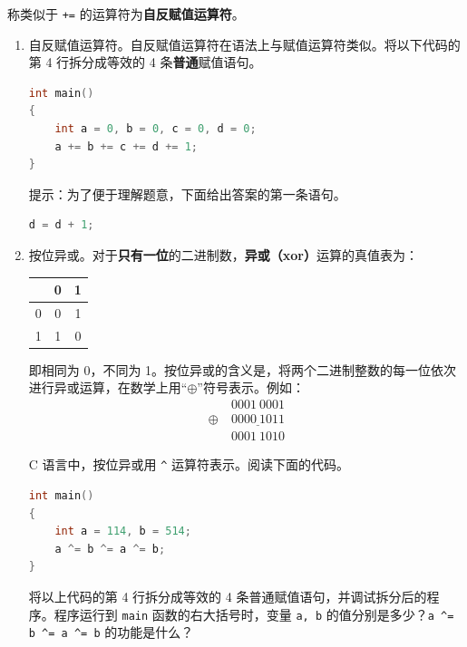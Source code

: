 \begin{problemset}
	称类似于 \lstinline{+=} 的运算符为\textbf{自反赋值运算符}。

	\begin{enumerate}
		\item 自反赋值运算符。自反赋值运算符在语法上与赋值运算符类似。将以下代码的第 4 行拆分成等效的 4 条\textbf{普通}赋值语句。

		\begin{lstlisting}[language=c]
int main()
{
	int a = 0, b = 0, c = 0, d = 0;
	a += b += c += d += 1;
}
		\end{lstlisting}

		提示：为了便于理解题意，下面给出答案的第一条语句。

		\begin{lstlisting}[language=c, numbers=none]
d = d + 1;
		\end{lstlisting}

		\item 按位异或。对于\textbf{只有一位}的二进制数，\textbf{异或（xor）}运算的真值表为：
		\begin{table}[H]
			\centering
			\begin{tabular}{c|c|c|}
				& 0 & 1
				\\\hline
				0 & 0 & 1
				\\\hline
				1 & 1 & 0
				\\\hline
			\end{tabular}
		\end{table}

		即相同为 0，不同为 1。按位异或的含义是，将两个二进制整数的每一位依次进行异或运算，在数学上用“$\oplus$”符号表示。例如：
		$$
		\begin{aligned}
			& 0001~0001
			\\
			\oplus~ & \underline{0000~1011}
			\\
			& 0001~1010
		\end{aligned}
		$$

		C 语言中，按位异或用 \lstinline{^} 运算符表示。阅读下面的代码。

		\begin{lstlisting}[language=c]
int main()
{
	int a = 114, b = 514;
	a ^= b ^= a ^= b;
}
		\end{lstlisting}

		将以上代码的第 4 行拆分成等效的 4 条普通赋值语句，并调试拆分后的程序。程序运行到 \lstinline{main} 函数的右大括号时，变量 \lstinline{a, b} 的值分别是多少？\lstinline{a ^= b ^= a ^= b} 的功能是什么？
	\end{enumerate}


\end{problemset}
